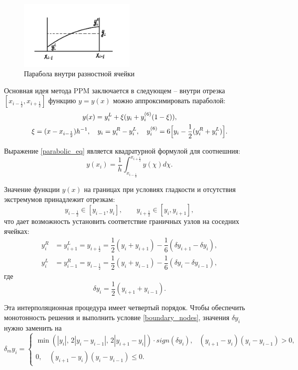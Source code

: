 \documentclass[12pt,a4paper]{article}
\newcommand{\half}{\frac{1}{2}}
\newcommand{\dhalf}{\dfrac{1}{2}}
\begin{document}
    \begin{figure}[h]
        \centering
        \includegraphics[width=0.5\textwidth]{ppm_visual.jpeg}
        \caption{Парабола внутри разностной ячейки}
        \label{fig:ppm_visual}
    \end{figure}

    Основная идея метода PPM заключается в следующем -- внутри отрезка $ [x_{i-\half}, x_{i+\half}] $ функцию $ y = y(x) $ можно аппроксимировать параболой:
    \begin{multline}
        \label{parabolic_eq}
        y(x) = y_i^L + \xi(\Delta y_i + y_i^{(6)}(1 - \xi)), \\
        \xi = (x - x_{i-\half})h^{-1}, \quad \Delta y_i = y_i^R-y_i^L, \quad y_i^{(6)} = 6\Bigl[ y_i - \half(y_i^R + y_i^L)\Bigr].
    \end{multline}

    Выражение \eqref{parabolic_eq} является квадратурной формулой для соотнешния:
    \[
        y(x_i) = \dfrac{1}{h} \displaystyle \int_{x_{i-\half}}^{x_{i+\half}} y(\chi) d\chi.
    \]

   Значение функции $ y(x) $ на границах при условиях гладкости и отсутствия экстремумов принадлежит отрезкам:
   \begin{equation}
        \label{boundary_nodes}
        y_{i-\half} \in [y_{i-1}, y_i], \qquad y_{i+\half} \in [y_i, y_{i+1}], 
   \end{equation}
   \noindent что дает возможность установить соответствие граничных узлов на соседних ячейках:
   \[
        \begin{split}
            y_i^R &= y_{i+1}^L = y_{i+\half} = \dhalf(y_i + y_{i+1}) - \dfrac{1}{6}(\delta y_{i+1} - \delta y_i), \\[0.7em]
            y_i^L &= y_{i-1}^R = y_{i-\half} = \dhalf(y_i + y_{i-1}) - \dfrac{1}{6}(\delta y_{i} - \delta y_{i-1}), 
        \end{split}
   \] 
   \noindent где 
   \[
        \delta y_i = \dhalf(y_{i+1} + y_{i-1}).
   \]

    Эта интерполяционная процедура имеет четвертый порядок. Чтобы обеспечить монотонность решения и выполнить условие \eqref{boundary_nodes}, значения $ \delta y_i $ нужно заменить на 
    \[
        \delta_m y_i = 
        \begin{cases}
            \min(|y_i|,\, 2|y_i - y_{i-1}|,\, 2|y_{i+1} - y_i|)\cdot sign(\delta y_i), & (y_{i+1} - y_i)(y_i - y_{i-1}) > 0, \\
            0, \quad (y_{i+1} - y_i)(y_i - y_{i-1}) \leq 0.
        \end{cases}  
    \]
\end{document}

